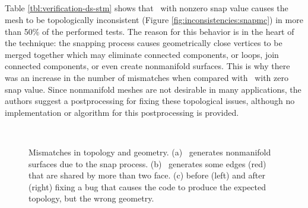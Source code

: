 \subsection{\snapmc}

Table \ref{tbl:verification-ds-stm} shows that \snapmc\ with nonzero snap value
causes the mesh to be topologically inconsistent (Figure 
\ref{fig:inconsistencies:snapmc}) in more than 50\% of the performed tests. 
The reason for this behavior is in the heart of the technique: the snapping process 
causes geometrically close vertices to be merged together 
which may eliminate connected components, or loops, join connected
components, or even create nonmanifold surfaces. This is why there was an increase
in the number of mismatches when compared with \snapmc\ with zero snap value.
Since nonmanifold meshes are not desirable in many applications, the authors 
suggest a postprocessing for fixing these topological issues, although no implementation
or algorithm for this postprocessing is provided.

\begin{figure}[t]
\centering
{} ~~~~~~~~
 ~~~~~~~~
\caption{Mismatches in topology and geometry. (a) \snapmc\ generates
  nonmanifold surfaces due to the snap process. (b)
  \matlab\ generates some edges (red) that are shared by more than two
  face. (c) \mcsimpleflow before (left) and after (right) fixing a bug
  that causes the code to produce the expected topology, but the wrong
  geometry.}
\label{fig:inconsistencies}
\end{figure}


